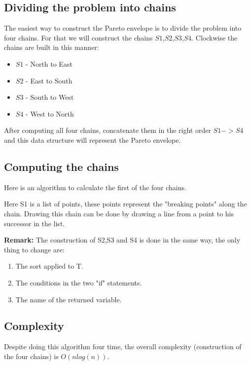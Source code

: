 \subsection{Dividing the problem into chains}
The easiest way to construct the Pareto envelope is to divide the problem into four chains. For that we will construct the chains $S1$,$S2$,$S3$,$S4$. Clockwise the chains are built in this manner:
\begin{itemize}[noitemsep, nolistsep]
	\item{$S1$ - North to East}
	\item{$S2$ - East to South}
	\item{$S3$ - South to West}
	\item{$S4$ - West to North}
\end{itemize}

After computing all four chains, concatenate them in the right order $S1 -> S4$ and this data structure will represent the Pareto envelope. 

\subsection{Computing the chains}
Here is an algorithm to calculate the first of the four chains.



Here S1 is a list of points, these points represent the "breaking points" along the chain. Drawing this chain can be done by drawing a line from a point to his successor in the list.\newline

\textbf{Remark:} The construction of S2,S3 and S4 is done in the same way, the only thing to change are:
\begin{enumerate}
	\item{The sort applied to T.}
	\item{The conditions in the two "if" statements.}
	\item{The name of the returned variable.}
\end{enumerate}

\subsection{Complexity}
Despite doing this algorithm four time, the overall complexity (construction of the four chains) is $O(nlog(n))$.\newline

